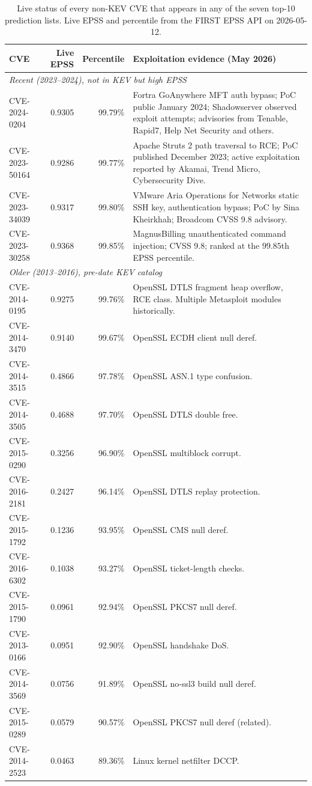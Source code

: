 \documentclass[11pt]{article}
\begin{document}
\begin{table}[h]
\centering
\small
\begin{tabular}{lrrp{}}
\toprule
CVE & Live EPSS & Percentile & Exploitation evidence (May 2026) \\
\midrule
\multicolumn{4}{l}{\textit{Recent (2023--2024), not in KEV but high EPSS}} \\
\midrule
CVE-2024-0204  & 0.9305 & 99.79\% & Fortra GoAnywhere MFT auth bypass; PoC public January 2024; Shadowserver observed exploit attempts; advisories from Tenable, Rapid7, Help Net Security and others. \\
CVE-2023-50164 & 0.9286 & 99.77\% & Apache Struts 2 path traversal to RCE; PoC published December 2023; active exploitation reported by Akamai, Trend Micro, Cybersecurity Dive. \\
CVE-2023-34039 & 0.9317 & 99.80\% & VMware Aria Operations for Networks static SSH key, authentication bypass; PoC by Sina Kheirkhah; Broadcom CVSS 9.8 advisory. \\
CVE-2023-30258 & 0.9368 & 99.85\% & MagnusBilling unauthenticated command injection; CVSS 9.8; ranked at the $99.85$th EPSS percentile. \\
\midrule
\multicolumn{4}{l}{\textit{Older (2013--2016), pre-date KEV catalog}} \\
\midrule
CVE-2014-0195  & 0.9275 & 99.76\% & OpenSSL DTLS fragment heap overflow, RCE class. Multiple Metasploit modules historically. \\
CVE-2014-3470  & 0.9140 & 99.67\% & OpenSSL ECDH client null deref. \\
CVE-2014-3515  & 0.4866 & 97.78\% & OpenSSL ASN.1 type confusion. \\
CVE-2014-3505  & 0.4688 & 97.70\% & OpenSSL DTLS double free. \\
CVE-2015-0290  & 0.3256 & 96.90\% & OpenSSL multiblock corrupt. \\
CVE-2016-2181  & 0.2427 & 96.14\% & OpenSSL DTLS replay protection. \\
CVE-2015-1792  & 0.1236 & 93.95\% & OpenSSL CMS null deref. \\
CVE-2016-6302  & 0.1038 & 93.27\% & OpenSSL ticket-length checks. \\
CVE-2015-1790  & 0.0961 & 92.94\% & OpenSSL PKCS7 null deref. \\
CVE-2013-0166  & 0.0951 & 92.90\% & OpenSSL handshake DoS. \\
CVE-2014-3569  & 0.0756 & 91.89\% & OpenSSL no-ssl3 build null deref. \\
CVE-2015-0289  & 0.0579 & 90.57\% & OpenSSL PKCS7 null deref (related). \\
CVE-2014-2523  & 0.0463 & 89.36\% & Linux kernel netfilter DCCP. \\
\bottomrule
\end{tabular}
\caption{Live status of every non-KEV CVE that appears in any of the
seven top-10 prediction lists. Live EPSS and percentile from the FIRST
EPSS API on 2026-05-12.}
\end{table}
\end{document}
